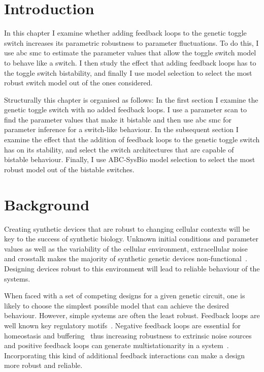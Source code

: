 \section{Introduction}

In this chapter I examine whether adding feedback loops to the genetic toggle switch increases its parametric robustness to parameter fluctuations. To do this, I use \acrshort{abc} \acrshort{smc} to estimate the parameter values that allow the toggle switch model to behave like a switch.  I then study the effect that adding feedback loops has to the toggle switch bistability, and finally I use model selection to select the most robust switch model out of the ones considered.

Structurally this chapter is organised as follows: In the first section I examine the genetic toggle switch with no added feedback loops. I use a parameter scan to find the parameter values that make it bistable and then use \acrshort{abc} \acrshort{smc} for parameter inference for a switch-like behaviour. In the subsequent section I examine the effect that the addition of feedback loops to the genetic toggle switch has on its stability, and select the switch architectures that are capable of bistable behaviour. Finally, I use ABC-SysBio model selection to select the most robust model out of the bistable switches.


\section{Background}


Creating synthetic devices that are robust to changing cellular contexts will be key to the success of synthetic biology. Unknown initial conditions and parameter values as well as the variability of the cellular environment, extracellular noise and crosstalk makes the majority of synthetic genetic devices non-functional~\autocite{Chen:2009ea}. Designing devices robust to this environment will lead to reliable behaviour of the systems.

When faced with a set of competing designs for a given genetic circuit, one is likely to choose the simplest possible model that can achieve the desired behaviour. However, simple systems are often the least robust. Feedback loops are well known key regulatory motifs~\autocite{Brandman:2005ci}. Negative feedback loops are essential for homeostasis and buffering~\autocite{Thomas:1995id} thus increasing robustness to extrinsic noise sources and positive feedback loops can generate multistationarity in a system~\autocite{Thomas:1995id}. Incorporating this kind of additional feedback interactions can make a design more robust and reliable. 


